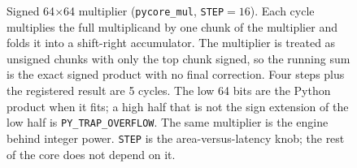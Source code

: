 \begin{figure}[htbp]
\centering
{}
\caption{Signed 64$\times$64 multiplier (\texttt{pycore\_mul}, \texttt{STEP}$=16$).
Each cycle multiplies the full multiplicand by one chunk of the multiplier and folds it into a shift-right accumulator.
The multiplier is treated as unsigned chunks with only the top chunk signed, so the running sum is the exact signed product with no final correction.
Four steps plus the registered result are 5 cycles.
The low 64 bits are the Python product when it fits; a high half that is not the sign extension of the low half is \texttt{PY\_TRAP\_OVERFLOW}.
The same multiplier is the engine behind integer power.
\texttt{STEP} is the area-versus-latency knob; the rest of the core does not depend on it.}
\label{fig:mul}
\end{figure}

